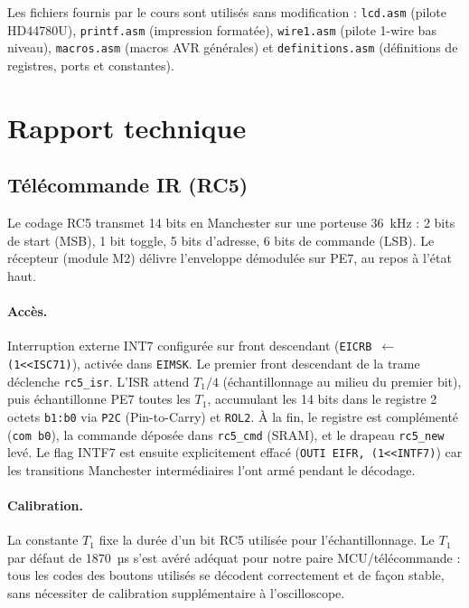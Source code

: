\documentclass[11pt]{article}
\begin{document}
Les fichiers fournis par le cours sont utilisés sans modification : \texttt{lcd.asm} (pilote HD44780U), \texttt{printf.asm} (impression formatée), \texttt{wire1.asm} (pilote 1-wire bas niveau), \texttt{macros.asm} (macros AVR générales) et \texttt{definitions.asm} (définitions de registres, ports et constantes).




\section{Rapport technique}

\subsection{Télécommande IR (RC5)}

Le codage RC5 transmet 14 bits en Manchester sur une porteuse 36~kHz : 2 bits de start (MSB), 1 bit toggle, 5 bits d'adresse, 6 bits de commande (LSB). Le récepteur (module M2) délivre l'enveloppe démodulée sur PE7, au repos à l'état haut.

\paragraph{Accès.} Interruption externe INT7 configurée sur front descendant (\texttt{EICRB $\leftarrow$ (1{<}{<}ISC71)}), activée dans \texttt{EIMSK}. Le premier front descendant de la trame déclenche \texttt{rc5\_isr}. L'ISR attend $T_1/4$ (échantillonnage au milieu du premier bit), puis échantillonne PE7 toutes les $T_1$, accumulant les 14 bits dans le registre 2 octets \texttt{b1:b0} via \texttt{P2C} (Pin-to-Carry) et \texttt{ROL2}. À la fin, le registre est complémenté (\texttt{com b0}), la commande déposée dans \texttt{rc5\_cmd} (SRAM), et le drapeau \texttt{rc5\_new} levé. Le flag INTF7 est ensuite explicitement effacé (\texttt{OUTI EIFR, (1{<}{<}INTF7)}) car les transitions Manchester intermédiaires l'ont armé pendant le décodage.

\paragraph{Calibration.} La constante $T_1$ fixe la durée d'un bit RC5 utilisée pour l'échantillonnage. Le $T_1$ par défaut de 1870~µs s'est avéré adéquat pour notre paire MCU/télécommande : tous les codes des boutons utilisés se décodent correctement et de façon stable, sans nécessiter de calibration supplémentaire à l'oscilloscope.
\end{document}
